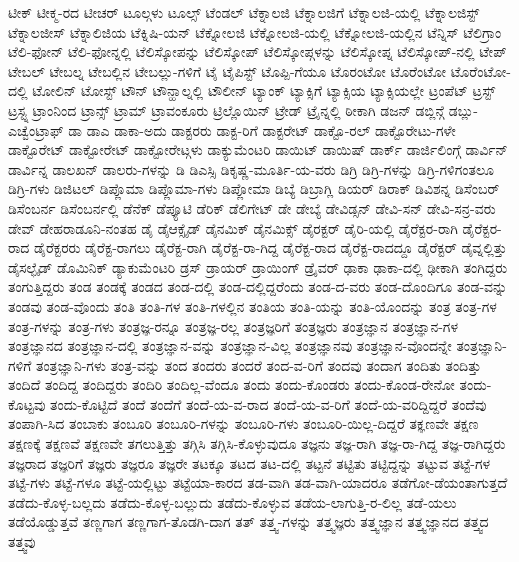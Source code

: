 {ಟೀಕ್
ಟೀಕ್ಮ-ರದ
ಟೀಚರ್
ಟೂಲ್ಗಳು
ಟೂಲ್ಸ್
ಟೆಂಡಲ್
ಟೆಕ್ನಾಲಜಿ
ಟೆಕ್ನಾಲಜಿಗೆ
ಟೆಕ್ನಾಲಜಿ-ಯಲ್ಲಿ
ಟೆಕ್ನಾಲಜಿಸ್ಟ್
ಟೆಕ್ನಾಲಜೀಸ್
ಟೆಕ್ನಾಲಿಜಿಯ
ಟೆಕ್ನಿಷಿ-ಯನ್
ಟೆಕ್ನೋಲಜಿ
ಟೆಕ್ನೋಲಜಿ-ಯಲ್ಲಿ
ಟೆಕ್ನೋಲಜಿ-ಯಲ್ಲಿನ
ಟೆನ್ನಿಸ್
ಟೆಲಿಗ್ರಾಂ
ಟೆಲಿ-ಫೋನ್
ಟೆಲಿ-ಫೋನ್ನಲ್ಲಿ
ಟೆಲಿಸ್ಕೋಪನ್ನು
ಟೆಲಿಸ್ಕೋಪ್
ಟೆಲಿಸ್ಕೋಪ್ಗಳನ್ನು
ಟೆಲಿಸ್ಕೋಪ್ನ
ಟೆಲಿಸ್ಕೋಪ್-ನಲ್ಲಿ
ಟೇಪ್
ಟೇಬಲ್
ಟೇಬಲ್ನ
ಟೇಬಲ್ಲಿನ
ಟೇಬಲ್ಲು-ಗಳಿಗೆ
ಟೈ
ಟೈಪಿಸ್ಟ್
ಟೊಪ್ಪಿ-ಗೆಯೂ
ಟೊರಂಟೋ
ಟೊರೆಂಟೋ
ಟೊರೆಂಟೋ-ದಲ್ಲಿ
ಟೋಲಿನ್
ಟೋಸ್ಟ್
ಟೌನ್
ಟೌನ್ಹಾಲ್ನಲ್ಲಿ
ಟೌಲೀನ್
ಟ್ಯಾಂಕ್
ಟ್ಯಾಕ್ಸಿಗೆ
ಟ್ಯಾಕ್ಸಿಯ
ಟ್ಯಾಕ್ಸಿಯಲ್ಲೇ
ಟ್ರಂಪೆಟ್
ಟ್ರಸ್ಟ್
ಟ್ರಸ್ಟ್ನ
ಟ್ರಾಂನಿಂದ
ಟ್ರಾನ್ಸ್
ಟ್ರಾಮ್
ಟ್ರಾವಂಕೂರು
ಟ್ರಿಲ್ಲೊಯಿನ್
ಟ್ರೇಡ್
ಟ್ರೈನ್ನಲ್ಲಿ
ಠೀಕಾಗಿ
ಡಜನ್
ಡಬ್ಲಿನ್ಗೆ
ಡಬ್ಲು-ಎಚ್ವೆಂಟ್ರಾಫ್
ಡಾ
ಡಾಎ
ಡಾಕಾ-ಅದು
ಡಾಕ್ಟರರು
ಡಾಕ್ಟ-ರಿಗೆ
ಡಾಕ್ಟರೇಟ್
ಡಾಕ್ಟೊ-ರಲ್
ಡಾಕ್ಟೊರೇಟು-ಗಳೇ
ಡಾಕ್ಟೊರೇಟ್
ಡಾಕ್ಟೋರೇಟ್
ಡಾಕ್ಟೋರೇಟ್ಗಳು
ಡಾಕ್ಯುಮೆಂಟರಿ
ಡಾಯಿಟ್
ಡಾಯಿಷ್
ಡಾರ್ಕ್
ಡಾರ್ಜಿಲಿಂಗ್ಗೆ
ಡಾರ್ವಿನ್
ಡಾರ್ವಿನ್ನ
ಡಾಲಖನ್
ಡಾಲರು-ಗಳನ್ನು
ಡಿ
ಡಿಎಸ್ಸಿ
ಡಿಕೃಷ್ಣ-ಮೂರ್ತಿ-ಯ-ವರು
ಡಿಗ್ರಿ
ಡಿಗ್ರಿ-ಗಳನ್ನು
ಡಿಗ್ರಿ-ಗಳಿಗಂತಲೂ
ಡಿಗ್ರಿ-ಗಳು
ಡಿಜಿಟಲ್
ಡಿಪ್ಲೊಮಾ
ಡಿಪ್ಲೊಮಾ-ಗಳು
ಡಿಪ್ಲೋಮಾ
ಡಿಬ್ಯೆ
ಡಿಬ್ರಾಗ್ಲಿ
ಡಿಯರ್
ಡಿರಾಕ್
ಡಿವಿಶನ್ನ
ಡಿಸೆಂಬರ್
ಡಿಸೆಂಬರ್ನ
ಡಿಸೆಂಬರ್ನಲ್ಲಿ
ಡೆನೆಕ್
ಡೆಪ್ಯೂಟಿ
ಡೆರಿಕ್
ಡೆಲಿಗೇಟ್
ಡೇ
ಡೇಬ್ಯೆ
ಡೇವಿಡ್ಸನ್
ಡೇವಿ-ಸನ್
ಡೇವಿ-ಸನ್ರ-ವರು
ಡೇವ್
ಡೇಹರಾಡೂನಿ-ನಂತಹ
ಡೈ
ಡೈಆಕ್ಸೈಡ್
ಡೈನಮಿಕ್
ಡೈನಮಿಕ್ಸ್
ಡೈರಕ್ಟರ್
ಡೈರಿ-ಯಲ್ಲಿ
ಡೈರೆಕ್ಟರ-ರಾಗಿ
ಡೈರೆಕ್ಟರ-ರಾದ
ಡೈರೆಕ್ಟರರು
ಡೈರೆಕ್ಟ-ರಾಗಲು
ಡೈರೆಕ್ಟ-ರಾಗಿ
ಡೈರೆಕ್ಟ-ರಾ-ಗಿದ್ದ
ಡೈರೆಕ್ಟ-ರಾದ
ಡೈರೆಕ್ಟ-ರಾದದ್ದೂ
ಡೈರೆಕ್ಟರ್
ಡೈವ್ನಲ್ಲಿತ್ತು
ಡೈಸಲ್ಫೈಡ್
ಡೊಮಿನಿಕ್
ಡ್ಯಾಕುಮೆಂಟರಿ
ಡ್ರಸ್
ಡ್ರಾಯರ್
ಡ್ರಾಯಿಂಗ್
ಡ್ರೈವರ್
ಢಾಕಾ
ಢಾಕಾ-ದಲ್ಲಿ
ಢೀಕಾಗಿ
ತಂಗಿದ್ದರು
ತಂಗುತ್ತಿದ್ದರು
ತಂಡ
ತಂಡಕ್ಕೆ
ತಂಡದ
ತಂಡ-ದಲ್ಲಿ
ತಂಡ-ದಲ್ಲಿದ್ದರೆಂದು
ತಂಡ-ದ-ವರು
ತಂಡ-ದೊಂದಿಗೂ
ತಂಡ-ವನ್ನು
ತಂಡವು
ತಂಡ-ವೊಂದು
ತಂತಿ
ತಂತಿ-ಗಳ
ತಂತಿ-ಗಳಲ್ಲಿನ
ತಂತಿಯ
ತಂತಿ-ಯನ್ನು
ತಂತಿ-ಯೊಂದನ್ನು
ತಂತ್ರ
ತಂತ್ರ-ಗಳ
ತಂತ್ರ-ಗಳನ್ನು
ತಂತ್ರ-ಗಳು
ತಂತ್ರಜ್ಞ-ರನ್ನೂ
ತಂತ್ರಜ್ಞ-ರಲ್ಲ
ತಂತ್ರಜ್ಞರಿಗೆ
ತಂತ್ರಜ್ಞರು
ತಂತ್ರಜ್ಞಾನ
ತಂತ್ರಜ್ಞಾನ-ಗಳ
ತಂತ್ರಜ್ಞಾನದ
ತಂತ್ರಜ್ಞಾನ-ದಲ್ಲಿ
ತಂತ್ರಜ್ಞಾನ-ವನ್ನು
ತಂತ್ರಜ್ಞಾನ-ವಿಲ್ಲ
ತಂತ್ರಜ್ಞಾನವು
ತಂತ್ರಜ್ಞಾನ-ವೊಂದನ್ನೇ
ತಂತ್ರಜ್ಞಾನಿ-ಗಳಿಗೆ
ತಂತ್ರಜ್ಞಾನಿ-ಗಳು
ತಂತ್ರ-ವನ್ನು
ತಂದ
ತಂದರು
ತಂದರೆ
ತಂದ-ವ-ರಿಗೆ
ತಂದವು
ತಂದಾಗ
ತಂದಿತು
ತಂದಿತ್ತು
ತಂದಿದೆ
ತಂದಿದ್ದ
ತಂದಿದ್ದರು
ತಂದಿರಿ
ತಂದಿಲ್ಲ-ವೆಂದೂ
ತಂದು
ತಂದು-ಕೊಂಡರು
ತಂದು-ಕೊಂಡ-ರೇನೋ
ತಂದು-ಕೊಟ್ಟವು
ತಂದು-ಕೊಟ್ಟಿದೆ
ತಂದೆ
ತಂದೆಗೆ
ತಂದೆ-ಯ-ವ-ರಾದ
ತಂದೆ-ಯ-ವ-ರಿಗೆ
ತಂದೆ-ಯ-ವರಿದ್ದಿದ್ದರೆ
ತಂದೆವು
ತಂಪಾಗಿ-ಸಿದ
ತಂಬಾಕು
ತಂಬೂರಿ
ತಂಬೂರಿ-ಗಳನ್ನು
ತಂಬೂರಿ-ಗಳು
ತಂಬೂರಿ-ಯಿಲ್ಲ-ದಿದ್ದರೆ
ತಕ್ಞಣವೇ
ತಕ್ಷಣ
ತಕ್ಷಣಕ್ಕೆ
ತಕ್ಷಣವೆ
ತಕ್ಷಣವೇ
ತಗಲುತ್ತಿತ್ತು
ತಗ್ಗಿಸಿ
ತಗ್ಗಿಸಿ-ಕೊಳ್ಳುವುದೂ
ತಜ್ಞನು
ತಜ್ಞ-ರಾಗಿ
ತಜ್ಞ-ರಾ-ಗಿದ್ದ
ತಜ್ಞ-ರಾಗಿದ್ದರು
ತಜ್ಞರಾದ
ತಜ್ಞರಿಗೆ
ತಜ್ಞರು
ತಜ್ಞರೂ
ತಜ್ಞರೇ
ತಟಕ್ಕೂ
ತಟದ
ತಟ-ದಲ್ಲಿ
ತಟ್ಟನೆ
ತಟ್ಟಿತು
ತಟ್ಟಿದ್ದನ್ನು
ತಟ್ಟುವ
ತಟ್ಟೆ-ಗಳ
ತಟ್ಟೆ-ಗಳು
ತಟ್ಟೆ-ಗಳೂ
ತಟ್ಟೆ-ಯಲ್ಲಿಟ್ಟು
ತಟ್ಟೆಯಾ-ಕಾರದ
ತಡ-ವಾಗಿ
ತಡ-ವಾಗಿ-ಯಾದರೂ
ತಡೆಗೋ-ಡೆಯಂತಾಗುತ್ತದೆ
ತಡೆದು-ಕೊಳ್ಳ-ಬಲ್ಲದು
ತಡೆದು-ಕೊಳ್ಳ-ಬಲ್ಲುದು
ತಡೆದು-ಕೊಳ್ಳುವ
ತಡೆಯ-ಲಾಗುತ್ತಿ-ರ-ಲಿಲ್ಲ
ತಡೆ-ಯಲು
ತಡೆಯೊಡ್ಡುತ್ತವೆ
ತಣ್ಣಗಾಗ
ತಣ್ಣಗಾಗ-ತೊಡಗಿ-ದಾಗ
ತತ್
ತತ್ತ್ವ-ಗಳನ್ನು
ತತ್ತ್ವಜ್ಞರು
ತತ್ತ್ವಜ್ಞಾನ
ತತ್ತ್ವಜ್ಞಾನದ
ತತ್ತ್ವದ
ತತ್ತ್ವವು
}
